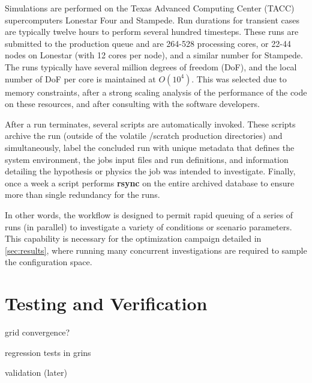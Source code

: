 Simulations are performed on the Texas Advanced Computing Center (TACC)
supercomputers Lonestar Four and Stampede. Run durations for transient
cases are typically twelve hours to perform several hundred timesteps. 
These runs are submitted to the production queue and are  
264-528 processing cores, 
or 22-44 nodes on Lonestar (with 12 cores per node), and a similar number
for Stampede. The runs typically have several million degrees of freedom (DoF), 
and the local number of DoF per core is maintained at $O(10^4)$. This was
selected due to memory constraints, after a strong scaling
analysis of the performance of the code on these resources, and
after consulting with the software developers.  

After a run terminates, several scripts are automatically invoked. 
These scripts archive the run (outside of the volatile /scratch 
production directories) and simultaneously, label the concluded run with
unique metadata that defines the system environment, the jobs input
files and run definitions, and information detailing the
hypothesis or physics the job was intended to investigate. Finally, once
a week a script performs \textbf{rsync} on the entire archived database to
ensure more than single redundancy for the runs. 

In other words, the workflow is designed to permit rapid queuing of a
series of runs (in parallel) to investigate a variety of conditions or
scenario parameters. This capability is necessary for the optimization
campaign detailed in \ref{sec:results}, where running many concurrent
investigations are required to sample the configuration space.  

\section{Testing and Verification}

grid convergence?

regression tests in grins

validation (later)